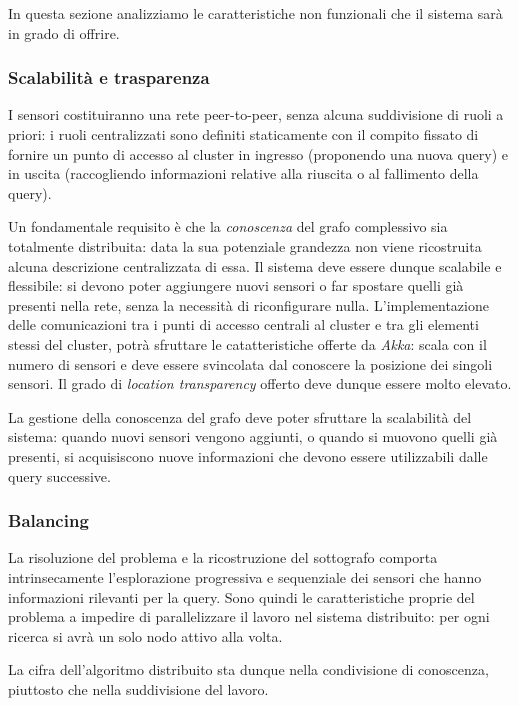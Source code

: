 \documentclass{llncs}
\begin{document}
In questa sezione analizziamo le caratteristiche non funzionali
che il sistema sarà in grado di offrire.

\subsubsection*{Scalabilità e trasparenza}
I sensori costituiranno una rete peer-to-peer,
senza alcuna suddivisione di ruoli a priori: i ruoli centralizzati
sono definiti staticamente con il compito fissato di fornire un punto
di accesso al cluster in ingresso (proponendo una nuova query) e
in uscita (raccogliendo informazioni relative alla riuscita
o al fallimento della query).

Un fondamentale requisito è che
la \emph{conoscenza} del grafo complessivo sia totalmente distribuita:
data la sua potenziale grandezza
non viene ricostruita alcuna descrizione centralizzata di essa.
Il sistema deve essere dunque scalabile e flessibile:
si devono poter aggiungere nuovi sensori o far spostare
quelli già presenti nella rete, senza la necessità di riconfigurare nulla.
L'implementazione delle
comunicazioni tra i punti di accesso centrali al cluster e
tra gli elementi stessi del cluster, potrà
sfruttare le catatteristiche offerte da \emph{Akka}:
scala con il numero di sensori e
deve essere svincolata dal conoscere la posizione dei singoli sensori.
Il grado di \emph{location transparency} offerto deve dunque essere molto elevato.

La gestione della conoscenza del grafo deve poter
sfruttare la scalabilità del sistema: quando nuovi sensori vengono
aggiunti, o quando si muovono quelli già presenti, si acquisiscono
nuove informazioni che devono essere utilizzabili dalle query successive.

\subsubsection*{Balancing}
La risoluzione del problema e la ricostruzione del sottografo
comporta intrinsecamente l'esplorazione progressiva e sequenziale
dei sensori che hanno informazioni rilevanti per la query.
Sono quindi le caratteristiche proprie del problema a impedire di
parallelizzare il lavoro nel sistema distribuito:
per ogni ricerca si avrà un solo nodo attivo alla volta.

La cifra dell'algoritmo distribuito sta dunque nella
condivisione di conoscenza, piuttosto che nella suddivisione del lavoro.
\end{document}
